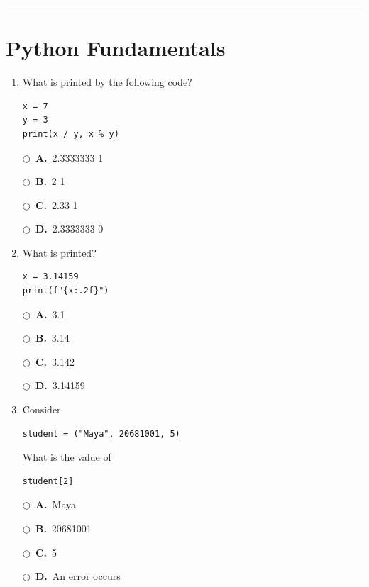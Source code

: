 \documentclass[11pt]{article}
\newcommand{\choice}[2]{%
    \par\noindent
    \(\bigcirc\)\ \textbf{#1.}\ #2
}
\begin{document}
\normalsize

\vspace{0.15cm}
\hrule
\vspace{0.25cm}

\twocolumn

\section*{Python Fundamentals}

\begin{enumerate}


\item What is printed by the following code?

\begin{verbatim}
x = 7
y = 3
print(x / y, x % y)
\end{verbatim}

\choice{A}{2.3333333 1}
\choice{B}{2 1}
\choice{C}{2.33 1}
\choice{D}{2.3333333 0}



\item What is printed?

\begin{verbatim}
x = 3.14159
print(f"{x:.2f}")
\end{verbatim}

\choice{A}{3.1}
\choice{B}{3.14}
\choice{C}{3.142}
\choice{D}{3.14159}



\item Consider

\begin{verbatim}
student = ("Maya", 20681001, 5)
\end{verbatim}

What is the value of

\begin{verbatim}
student[2]
\end{verbatim}

\choice{A}{Maya}
\choice{B}{20681001}
\choice{C}{5}
\choice{D}{An error occurs}



\end{enumerate}
\end{document}
